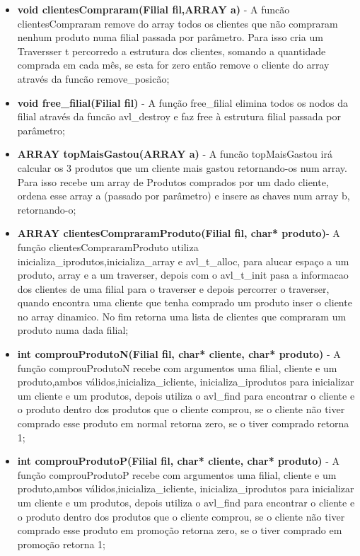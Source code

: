 \begin{itemize}
\item	\textbf{void clientesCompraram(Filial fil,ARRAY a)} - A funcão clientesCompraram remove do array todos os clientes que não compraram nenhum produto numa filial passada por parâmetro. Para isso cria um Traversser t percorredo a estrutura dos clientes, somando a quantidade comprada em cada mês, se esta for zero então remove o cliente do array através da funcão remove\_posicão; 

\item	\textbf{void free\_filial(Filial fil)} - A função free\_filial elimina todos os nodos da filial através da funcão avl\_destroy e faz  free à estrutura filial passada por parâmetro; 

\item	\textbf{ARRAY topMaisGastou(ARRAY a)} - A funcão topMaisGastou irá calcular os 3 produtos que um cliente mais gastou retornando-os num array. Para isso recebe um array de Produtos comprados por um dado cliente, ordena esse array a (passado por parâmetro) e insere as chaves num array b, retornando-o; 

\item	\textbf{ARRAY clientesCompraramProduto(Filial fil, char* produto)}- A função clientesCompraramProduto utiliza inicializa\_iprodutos,inicializa\_array e avl\_t\_alloc, para alucar espaço a um produto, array e a um traverser, depois com o avl\_t\_init pasa a informacao dos clientes de uma filial para o traverser e depois percorrer o traverser, quando encontra uma cliente que tenha comprado um produto inser o cliente no array dinamico. No fim retorna uma lista de clientes que compraram um produto numa dada filial;

\item	\textbf{int comprouProdutoN(Filial fil, char* cliente, char* produto)} - A função comprouProdutoN recebe com argumentos uma filial, cliente e um produto,ambos válidos,inicializa\_icliente, inicializa\_iprodutos para inicializar um cliente e um produtos, depois utiliza o avl\_find para encontrar o cliente e o produto dentro dos produtos que o cliente comprou, se o cliente não tiver comprado esse produto em normal retorna zero, se o tiver comprado retorna 1; 

\item	\textbf{int comprouProdutoP(Filial fil, char* cliente, char* produto)} - A função comprouProdutoP recebe com argumentos uma filial, cliente e um produto,ambos válidos,inicializa\_icliente, inicializa\_iprodutos para inicializar um cliente e um produtos, depois utiliza o avl\_find para encontrar o cliente  e o produto dentro dos produtos que o cliente comprou, se o cliente não tiver comprado esse produto em promoção retorna zero, se o tiver comprado em promoção retorna 1;


\end{itemize}
